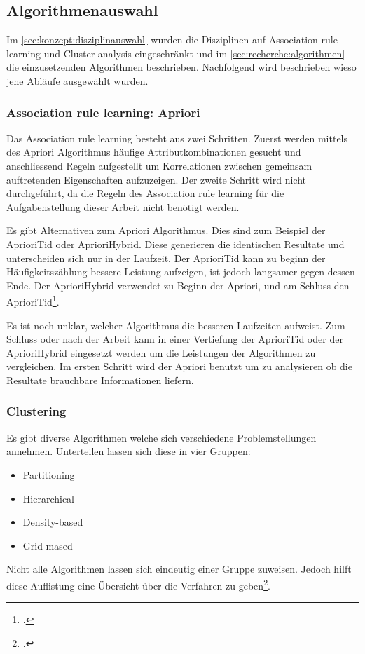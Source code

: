 \subsection{Algorithmenauswahl}
\label{sec:konzept:algorithmenauswahl}
Im \cref{sec:konzept:disziplinauswahl} wurden die Disziplinen auf Association rule learning und Cluster analysis eingeschränkt und im \cref{sec:recherche:algorithmen} die einzusetzenden Algorithmen beschrieben. Nachfolgend wird beschrieben wieso jene Abläufe ausgewählt wurden.

\subsubsection{Association rule learning: Apriori}
\label{sec:konzept:algorithmenauswahl:apriori}
Das Association rule learning besteht aus zwei Schritten. Zuerst werden mittels des Apriori Algorithmus häufige Attributkombinationen gesucht und anschliessend Regeln aufgestellt um Korrelationen zwischen gemeinsam auftretenden Eigenschaften aufzuzeigen.
Der zweite Schritt wird nicht durchgeführt, da die Regeln des Association rule learning für die Aufgabenstellung dieser Arbeit nicht benötigt werden.

Es gibt Alternativen zum Apriori Algorithmus. Dies sind zum Beispiel der AprioriTid oder AprioriHybrid. Diese generieren die identischen Resultate und unterscheiden sich nur in der Laufzeit. Der AprioriTid kann zu beginn der Häufigkeitszählung bessere Leistung aufzeigen, ist jedoch langsamer gegen dessen Ende. Der AprioriHybrid verwendet zu Beginn der Apriori, und am Schluss den AprioriTid\footcite{association_rule_learning_2017-01-05}. 

Es ist noch unklar, welcher Algorithmus die besseren Laufzeiten aufweist. Zum Schluss oder nach der Arbeit kann in einer Vertiefung der AprioriTid oder der AprioriHybrid eingesetzt werden um die Leistungen der Algorithmen zu vergleichen. Im ersten Schritt wird der Apriori benutzt um zu analysieren ob die Resultate brauchbare Informationen liefern.

\subsubsection{Clustering}
\label{sec:konzept:algorithmenauswahl:clustering}
Es gibt diverse Algorithmen welche sich verschiedene Problemstellungen annehmen. Unterteilen lassen sich diese in vier Gruppen:
\begin{itemize}
	\item Partitioning
	\item Hierarchical
	\item Density-based
	\item Grid-mased
\end{itemize}
Nicht alle Algorithmen lassen sich eindeutig einer Gruppe zuweisen. Jedoch hilft diese Auflistung eine Übersicht über die Verfahren zu geben\footcite{data_mining_concepts_and_techniques}.

